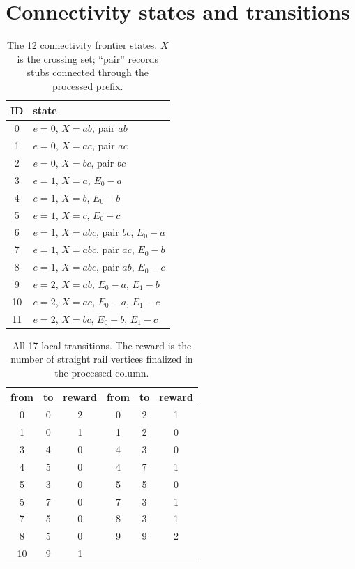 \documentclass[11pt]{article}
\theoremstyle{definition}
\begin{document}
\section{Connectivity states and transitions}\label{app:states}
\begin{table}[h]
\centering
\caption{The 12 connectivity frontier states.  $X$ is the crossing set; ``pair'' records stubs connected through the processed prefix.}\label{tab:states}
\small
\begin{tabular}{cl}
\toprule
ID & state\\
\midrule
0 & $e=0$, $X=ab$, pair $ab$\\
1 & $e=0$, $X=ac$, pair $ac$\\
2 & $e=0$, $X=bc$, pair $bc$\\
3 & $e=1$, $X=a$, $E_0-a$\\
4 & $e=1$, $X=b$, $E_0-b$\\
5 & $e=1$, $X=c$, $E_0-c$\\
6 & $e=1$, $X=abc$, pair $bc$, $E_0-a$\\
7 & $e=1$, $X=abc$, pair $ac$, $E_0-b$\\
8 & $e=1$, $X=abc$, pair $ab$, $E_0-c$\\
9 & $e=2$, $X=ab$, $E_0-a$, $E_1-b$\\
10 & $e=2$, $X=ac$, $E_0-a$, $E_1-c$\\
11 & $e=2$, $X=bc$, $E_0-b$, $E_1-c$\\
\bottomrule
\end{tabular}
\end{table}

\begin{table}[h]
\centering
\caption{All 17 local transitions.  The reward is the number of straight rail vertices finalized in the processed column.}\label{tab:transitions}
\small
\begin{tabular}{ccc@{\qquad}ccc}
\toprule
from & to & reward & from & to & reward\\
\midrule
0&0&2 & 0&2&1\\
1&0&1 & 1&2&0\\
3&4&0 & 4&3&0\\
4&5&0 & 4&7&1\\
5&3&0 & 5&5&0\\
5&7&0 & 7&3&1\\
7&5&0 & 8&3&1\\
8&5&0 & 9&9&2\\
10&9&1 & & &\\
\bottomrule
\end{tabular}
\end{table}
\end{document}
